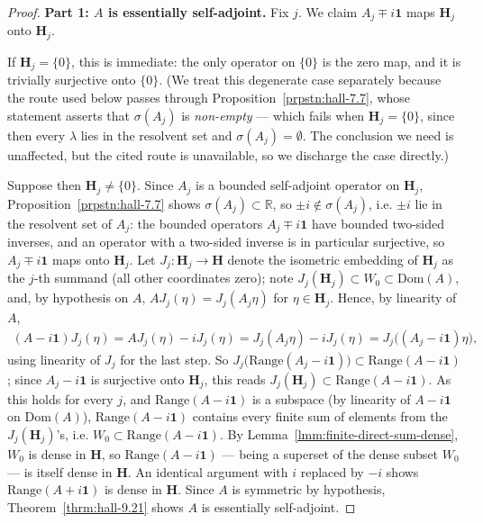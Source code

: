 \begin{proof}
    \leanok
\textbf{Part 1: $A$ is essentially self-adjoint.} Fix $j$. We claim $A_j \mp i\mathbf{1}$ maps $\mathbf{H}_j$ onto $\mathbf{H}_j$.

If $\mathbf{H}_j = \{0\}$, this is immediate: the only operator on $\{0\}$ is the zero map, and it is trivially surjective onto $\{0\}$. (We treat this degenerate case separately because the route used below passes through Proposition~\ref{prpstn:hall-7.7}, whose statement asserts that $\sigma(A_j)$ is \textit{non-empty} — which fails when $\mathbf{H}_j = \{0\}$, since then every $\lambda$ lies in the resolvent set and $\sigma(A_j) = \emptyset$. The conclusion we need is unaffected, but the cited route is unavailable, so we discharge the case directly.)

Suppose then $\mathbf{H}_j \ne \{0\}$. Since $A_j$ is a bounded self-adjoint operator on $\mathbf{H}_j$, Proposition~\ref{prpstn:hall-7.7} shows $\sigma(A_j) \subset \mathbb{R}$, so $\pm i \notin \sigma(A_j)$, i.e. $\pm i$ lie in the resolvent set of $A_j$: the bounded operators $A_j \mp i\mathbf{1}$ have bounded two-sided inverses, and an operator with a two-sided inverse is in particular surjective, so $A_j \mp i\mathbf{1}$ maps onto $\mathbf{H}_j$. Let $J_j : \mathbf{H}_j \to \mathbf{H}$ denote the isometric embedding of $\mathbf{H}_j$ as the $j$-th summand (all other coordinates zero); note $J_j(\mathbf{H}_j) \subset W_0 \subset \text{Dom}(A)$, and, by hypothesis on $A$, $A J_j(\eta) = J_j(A_j \eta)$ for $\eta \in \mathbf{H}_j$. Hence, by linearity of $A$,
\begin{align}
    (A - i\mathbf{1}) J_j(\eta) = AJ_j(\eta) - iJ_j(\eta) = J_j(A_j \eta) - iJ_j(\eta) = J_j\big( (A_j - i\mathbf{1})\eta \big),
\end{align}
using linearity of $J_j$ for the last step. So $J_j\big( \text{Range}(A_j - i\mathbf{1}) \big) \subset \text{Range}(A - i\mathbf{1})$; since $A_j - i\mathbf{1}$ is surjective onto $\mathbf{H}_j$, this reads $J_j(\mathbf{H}_j) \subset \text{Range}(A - i\mathbf{1})$. As this holds for every $j$, and $\text{Range}(A - i\mathbf{1})$ is a subspace (by linearity of $A - i\mathbf{1}$ on $\text{Dom}(A)$), $\text{Range}(A - i\mathbf{1})$ contains every finite sum of elements from the $J_j(\mathbf{H}_j)$'s, i.e. $W_0 \subset \text{Range}(A - i\mathbf{1})$. By Lemma~\ref{lmm:finite-direct-sum-dense}, $W_0$ is dense in $\mathbf{H}$, so $\text{Range}(A - i\mathbf{1})$ — being a superset of the dense subset $W_0$ — is itself dense in $\mathbf{H}$. An identical argument with $i$ replaced by $-i$ shows $\text{Range}(A + i\mathbf{1})$ is dense in $\mathbf{H}$. Since $A$ is symmetric by hypothesis, Theorem~\ref{thrm:hall-9.21} shows $A$ is essentially self-adjoint.


\end{proof}
